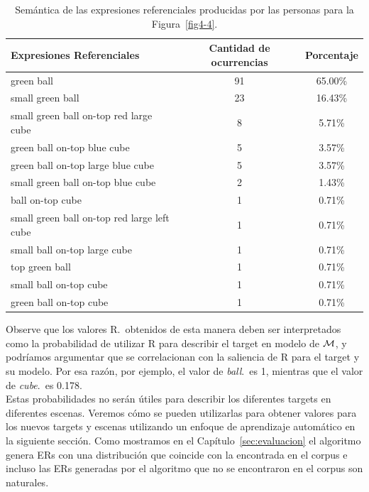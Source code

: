 \begin{table}[h!]
\begin{center}
\begin{tabular}{|l|c|c|}
\hline
Expresiones Referenciales & Cantidad de ocurrencias & Porcentaje \\
\hline

green ball & 91 & 65.00\% \\
small green ball   & 23 & 16.43\% \\
small green ball on-top red large cube & 8 & 5.71\% \\
green ball on-top blue cube & 5 & 3.57\% \\
green ball on-top large blue cube & 5 & 3.57\% \\
small green ball on-top blue cube & 2 & 1.43\% \\
ball on-top cube & 1 & 0.71\% \\
small green ball on-top red large left cube  & 1 & 0.71\% \\
small ball on-top large cube & 1 & 0.71\% \\
top green ball  & 1 & 0.71\% \\
small ball on-top cube & 1 & 0.71\% \\
green ball on-top cube & 1 & 0.71\% \\

\hline
\end{tabular}
\caption{Sem\'antica de las expresiones referenciales producidas por las personas para la Figura~\ref{fig4-4}.}\label{corpus-distribution}
\end{center}
\end{table}

Observe que los valores R.\puse\ obtenidos de esta manera deben ser
interpretados como la probabilidad de utilizar R para describir el target en
modelo de $\mathcal{M} $, y podr\'{i}amos argumentar que se correlacionan con la
 saliencia de R para el target y su modelo. Por esa raz\'on, por ejemplo, el
valor de \emph{ball}.\puse\ es 1, mientras que el valor de
\emph{cube}.\puse\ es 0.178. \\

Estas probabilidades no ser\'an \'utiles
para describir los diferentes targets en diferentes escenas. Veremos c\'omo se
pueden utilizarlas para obtener valores para los nuevos targets y escenas utilizando un
enfoque de aprendizaje autom\'atico en la siguiente secci\'on. Como mostramos en el Cap\'itulo~\ref{sec:evaluacion} el algoritmo genera ERs con una distribuci\'on que coincide con la encontrada en el corpus e incluso las ERs generadas por el algoritmo que no se encontraron
en el corpus son naturales.



